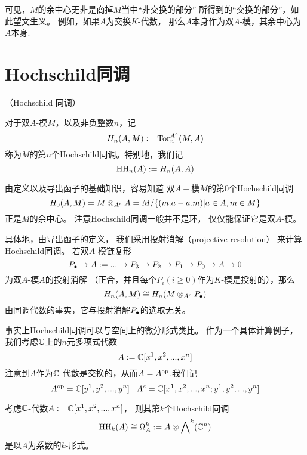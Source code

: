 可见，$M$的余中心无非是商掉$M$当中“非交换的部分”
所得到的“交换的部分”，如此望文生义。
例如，如果$A$为交换$K$-代数，
那么$A$本身作为双$A$-模，其余中心为$A$本身.

\section{Hochschild同调}

\begin{definition}（Hochschild 同调）

对于双$A$-模$M$，以及非负整数$n$，记
$$H_n(A,M):=\operatorname{Tor}_n^{A^e}(M,A)$$
称为$M$的第$n$个Hochschild同调。特别地，我们记
$$\operatorname{HH}_n(A):=H_n(A,A)$$
\end{definition}

由定义以及导出函子的基础知识，容易知道
双$A-$模$M$的第$0$个Hochschild同调
$$H_0(A,M)=M\otimes_{A^e}A=M/\{(m.a-a.m)|a\in A,m\in M\}$$
正是$M$的余中心。
注意Hochschild同调一般并不是环，
仅仅能保证它是双$A$-模。


具体地，由导出函子的定义，
我们采用投射消解（projective resolution）
来计算Hochschild同调。
若双$A$-模链复形
$$P_{\bullet}\to A:=
...\to P_3\to P_2\to P_1\to P_0\to A\to 0$$
为双$A$-模$A$的投射消解
（正合，并且每个$P_i(i\geq 0)$作为$K$-模是投射的），那么
$$H_n(A,M)\cong H_n(M\otimes_{A^e}P_{\bullet})$$
由同调代数的事实，它与投射消解$P_{\bullet}$的选取无关。\vs

事实上Hochschild同调可以与空间上的微分形式类比。
作为一个具体计算例子，我们考虑$\mathbb{C}$上的$n$元多项式代数
$$A:=\mathbb{C}[x^1,x^2,...,x^n]$$
注意到$A$作为$\mathbb{C}$-代数是交换的，从而$A=A^{\text{op}}$.我们记
$$A^{\text{op}}=\mathbb{C}[y^1,y^2,...,y^n]\,\,\,\,\,
A^e=\mathbb{C}[x^1,x^2,...,x^n;y^1,y^2,...,y^n]$$

\begin{prop}
\label{C[x^i]的HH同调}
考虑$\mathbb{C}$-代数$A:=\mathbb{C}[x^1,x^2,...,x^n]$，
则其第$k$个Hochschild同调
$$\operatorname{HH}_k(A)\cong\Omega^k_A:=A\otimes\bigwedge\nolimits^ k(\mathbb{C}^n)$$
是以$A$为系数的$k$-形式。
\end{prop}

